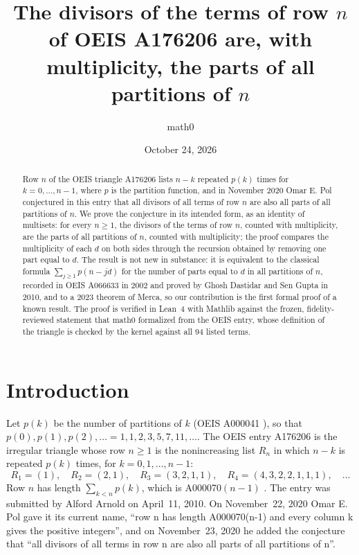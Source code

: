 \documentclass[11pt]{amsart}
\title[Divisors of the rows of OEIS A176206 and parts of partitions]{The divisors of the terms of row $n$ of OEIS A176206 are, with multiplicity, the parts of all partitions of $n$}
\author{math0}
\date{October 24, 2026}
\theoremstyle{plain}
\theoremstyle{definition}
\begin{document}
\begin{abstract}
Row $n$ of the OEIS triangle A176206 lists $n-k$ repeated $p(k)$ times for $k=0,\dots,n-1$, where $p$ is the partition function, and in November 2020 Omar E. Pol conjectured in this entry that all divisors of all terms of row $n$ are also all parts of all partitions of $n$.
We prove the conjecture in its intended form, as an identity of multisets: for every $n\ge1$, the divisors of the terms of row $n$, counted with multiplicity, are the parts of all partitions of $n$, counted with multiplicity; the proof compares the multiplicity of each $d$ on both sides through the recursion obtained by removing one part equal to $d$.
The result is not new in substance: it is equivalent to the classical formula $\sum_{j\ge1}p(n-jd)$ for the number of parts equal to $d$ in all partitions of $n$, recorded in OEIS A066633 in 2002 and proved by Ghosh Dastidar and Sen Gupta in 2010, and to a 2023 theorem of Merca, so our contribution is the first formal proof of a known result.
The proof is verified in Lean~4 with Mathlib against the frozen, fidelity-reviewed statement that math0 formalized from the OEIS entry, whose definition of the triangle is checked by the kernel against all $94$ listed terms.
\end{abstract}
\maketitle

\section{Introduction}

Let $p(k)$ be the number of partitions of $k$ (OEIS A000041 \cite{A000041}), so that $p(0),p(1),p(2),\dots=1,1,2,3,5,7,11,\dots$.
The OEIS entry A176206 \cite{A176206} is the irregular triangle whose row $n\ge1$ is the nonincreasing list $R_n$ in which $n-k$ is repeated $p(k)$ times, for $k=0,1,\dots,n-1$:
\[
  R_1=(1),\quad R_2=(2,1),\quad R_3=(3,2,1,1),\quad R_4=(4,3,2,2,1,1,1),\quad\dots
\]
Row $n$ has length $\sum_{k<n}p(k)$, which is A000070$(n-1)$ \cite{A000070}.
The entry was submitted by Alford Arnold on April~11, 2010.
On November~22, 2020 Omar E. Pol gave it its current name, ``row n has length A000070(n-1) and every column k gives the positive integers'', and on November~23, 2020 he added the conjecture that ``all divisors of all terms in row n are also all parts of all partitions of n''.
\end{document}
